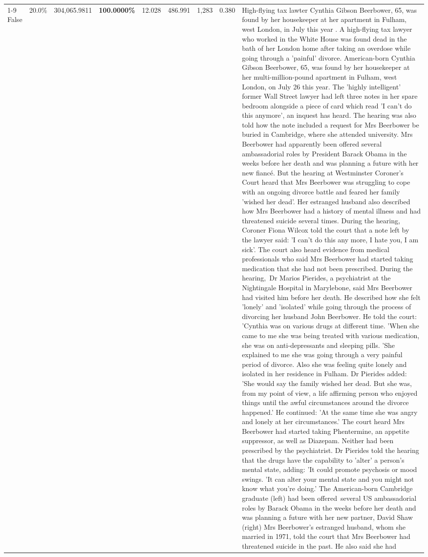 \begin{table}[H]
\begin{tabular}{lllrlllll}
\cline{1-9}
False & 20.0\% & \color{red} 304,065.9811 & \bfseries \color{red} 100.0000\% & 12.028 & 486.991 & 1,283 & 0.380 & High-flying tax lawter Cynthia Gibson Beerbower, 65, was found by her housekeeper at her apartment in Fulham, west London, in July this year . A high-flying tax lawyer who worked in the White House was found dead in the bath of her London home after taking an overdose while going through a 'painful' divorce. American-born Cynthia Gibson Beerbower, 65, was found by her housekeeper at her multi-million-pound apartment in Fulham, west London, on July 26 this year. The 'highly intelligent' former Wall Street lawyer had left three notes in her spare bedroom alongside a piece of card which read 'I can't do this anymore', an inquest has heard. The hearing was also told how the note included a request for Mrs Beerbower be buried in Cambridge, where she attended university. Mrs Beerbower had apparently been offered several ambassadorial roles by President Barack Obama in the weeks before her death and was planning a future with her new fiancé. But the hearing at Westminster Coroner's Court heard that Mrs Beerbower was struggling to cope with an ongoing divorce battle and feared her family 'wished her dead'. Her estranged husband also described how Mrs Beerbower had a history of mental illness and had threatened suicide several times. During the hearing, Coroner Fiona Wilcox told the court that a note left by the lawyer said: 'I can't do this any more, I hate you, I am sick'. The court also heard evidence from medical professionals who said Mrs Beerbower had started taking medication that she had not been prescribed. During the hearing, Dr Marios Pierides, a psychiatrist at the Nightingale Hospital in Marylebone, said Mrs Beerbower had visited him before her death. He described how she felt 'lonely' and 'isolated' while going through the process of divorcing her husband John Beerbower. He told the court: 'Cynthia was on various drugs at different time. 'When she came to me she was being treated with various medication, she was on anti-depressants and sleeping pills. 'She explained to me she was going through a very painful period of divorce. Also she was feeling quite lonely and isolated in her residence in Fulham. Dr Pierides added: 'She would say the family wished her dead. But she was, from my point of view, a life affirming person who enjoyed things until the awful circumstances around the divorce happened.' He continued: 'At the same time she was angry and lonely at her circumstances.' The court heard Mrs Beerbower had started taking Phentermine, an appetite suppressor, as well as Diazepam. Neither had been prescribed by the psychiatrist. Dr Pierides told the hearing that the drugs have the capability to 'alter' a person's mental state, adding: 'It could promote psychosis or mood swings. 'It can alter your mental state and you might not know what you're doing.' The American-born Cambridge graduate (left) had been offered several US ambassadorial roles by Barack Obama in the weeks before her death and was planning a future with her new partner, David Shaw (right) Mrs Beerbower's estranged husband, whom she married in 1971, told the court that Mrs Beerbower had threatened suicide in the past. He also said she had 
\end{tabular}
\end{table}
